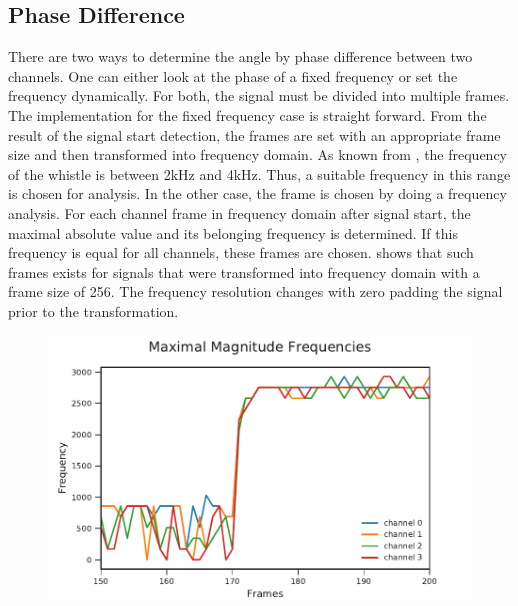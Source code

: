 \subsection*{Phase Difference}
\label{subsec:03_phase}

There are two ways to determine the angle by phase difference
between two channels.
One can either look at the phase of a fixed frequency or set the frequency
dynamically.
For both, the signal must be divided into multiple frames.
The implementation for the fixed frequency case is straight forward.
From the result of the signal start detection, the frames
are set with an appropriate frame size and then transformed into
frequency domain.
As known from \cite{Hasselbring}, the frequency of the whistle is between 2\si{\kilo\hertz}
and 4\si{\kilo\hertz}.
Thus, a suitable frequency in this range is chosen for analysis.
In the other case, the frame is chosen by doing a
frequency analysis.
For each channel frame in frequency domain after signal start,
the maximal absolute value and its belonging frequency is determined.
If this frequency is equal for all channels, these frames
are chosen.
 shows that such frames exists for signals that
were transformed into frequency domain with a frame size of 256.
The frequency resolution changes with zero padding the signal prior
to the transformation.
\begin{figure}[ht]
	\centering
		\includegraphics[]{figures/maxFreq}
	\caption{}
    \label{fig:03_maxFreq}
\end{figure}

